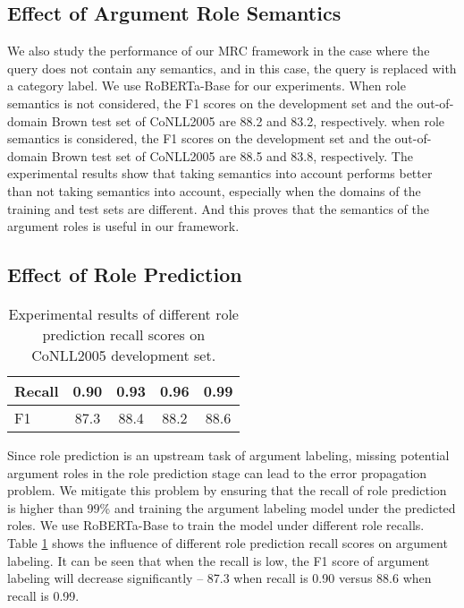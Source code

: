 \documentclass[11pt]{article}
\begin{document}
\subsection{Effect of Argument Role Semantics}
We also study the performance of our MRC framework in the case where the query does not contain any semantics, and in this case, the query is replaced with a category label. We use RoBERTa-Base for our experiments. When role semantics is not  considered, the F1 scores on the development set and the out-of-domain Brown test set of CoNLL2005 are 88.2 and 83.2, respectively. when role semantics is considered, the F1 scores on the development set and the out-of-domain Brown test set of CoNLL2005 are 88.5 and 83.8, respectively. The experimental results show that taking semantics into account performs better than not taking semantics into account, especially when the domains of the training and test sets are different. And this proves that the semantics of the argument roles is useful in our framework.


\subsection{Effect of Role Prediction}
\begin{table}
\centering
\begin{tabular}{lcccc} 
\toprule
Recall & 0.90 & 0.93 & 0.96 & 0.99  \\
\hline
F1     & 87.3 & 88.4 & 88.2 & 88.6  \\
\bottomrule
\end{tabular}
\caption{Experimental results of different role prediction recall scores on CoNLL2005 development set.}
\label{tab:recall}
\end{table}
Since role prediction is an upstream task of argument labeling, missing potential argument roles in the role prediction stage can lead to the error propagation problem. We mitigate this problem by ensuring that the recall of role prediction is higher than 99\% and training the argument labeling model under the predicted roles. We use RoBERTa-Base to train the model under different role recalls. Table \ref{tab:recall} shows the influence of different role prediction recall scores on argument labeling. It can be seen that when the recall is low, the F1 score of argument labeling will decrease significantly -- 87.3 when recall is 0.90 versus 88.6 when recall is 0.99.
\par
\end{document}
